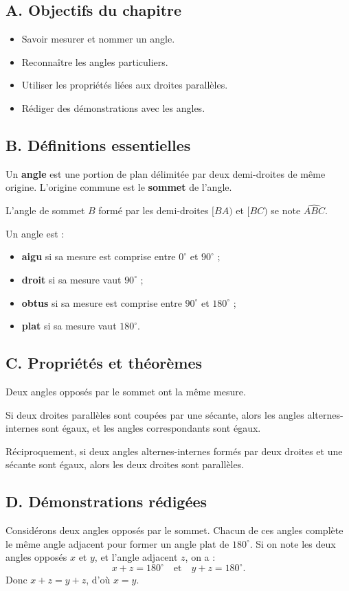 \documentclass[11pt,a4paper]{article}
\newcommand{\objectif}[1]{\subsection*{A. Objectifs du chapitre}#1}
\newcommand{\defs}{\subsection*{B. Définitions essentielles}}
\newcommand{\props}{\subsection*{C. Propriétés et théorèmes}}
\newcommand{\demos}{\subsection*{D. Démonstrations rédigées}}
\begin{document}
\objectif{
\begin{itemize}
\item Savoir mesurer et nommer un angle.
\item Reconnaître les angles particuliers.
\item Utiliser les propriétés liées aux droites parallèles.
\item Rédiger des démonstrations avec les angles.
\end{itemize}}

\defs
\begin{definitionbox}
Un \textbf{angle} est une portion de plan délimitée par deux demi-droites de même origine. L'origine commune est le \textbf{sommet} de l'angle.

L'angle de sommet $B$ formé par les demi-droites $[BA)$ et $[BC)$ se note $\widehat{ABC}$.
\end{definitionbox}

\begin{definitionbox}
Un angle est :
\begin{itemize}
\item \textbf{aigu} si sa mesure est comprise entre $0^\circ$ et $90^\circ$ ;
\item \textbf{droit} si sa mesure vaut $90^\circ$ ;
\item \textbf{obtus} si sa mesure est comprise entre $90^\circ$ et $180^\circ$ ;
\item \textbf{plat} si sa mesure vaut $180^\circ$.
\end{itemize}
\end{definitionbox}

\props
\begin{proprietebox}
Deux angles opposés par le sommet ont la même mesure.
\end{proprietebox}

\begin{proprietebox}
Si deux droites parallèles sont coupées par une sécante, alors les angles alternes-internes sont égaux, et les angles correspondants sont égaux.
\end{proprietebox}

\begin{proprietebox}
Réciproquement, si deux angles alternes-internes formés par deux droites et une sécante sont égaux, alors les deux droites sont parallèles.
\end{proprietebox}

\demos
\begin{preuvebox}
Considérons deux angles opposés par le sommet. Chacun de ces angles complète le même angle adjacent pour former un angle plat de $180^\circ$. Si on note les deux angles opposés $x$ et $y$, et l'angle adjacent $z$, on a :
\[
x+z=180^\circ \quad \text{et} \quad y+z=180^\circ.
\]
Donc $x+z=y+z$, d'où $x=y$.
\end{preuvebox}
\end{document}
